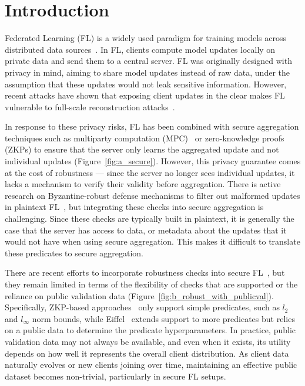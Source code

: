 \section{Introduction}
\label{sec:intro}








Federated Learning (FL) is a widely used paradigm for training models across distributed data sources~\cite{fedavg}. 
In FL, clients compute model updates locally on private data and send them to a central server. 
FL was originally designed with privacy in mind, aiming to share model updates instead of raw data, under the assumption that these updates would not leak sensitive information. However, recent attacks have shown that exposing client updates in the clear makes FL vulnerable to full-scale reconstruction attacks~\citep{zhu2019deep,geiping2020inverting}.


In response to these privacy risks, FL has been combined with secure aggregation techniques such as multiparty computation (MPC)~\cite{bonawitz2017practical, bell2020secure, fereidooni2021safelearn, so2022lightsecagg} or zero-knowledge proofs (ZKPs) to ensure that the server only learns the aggregated update and not individual updates (Figure~\ref{fig:a_secure}).
However, this privacy guarantee comes at the cost of robustness --- since the server no longer sees individual updates, it lacks a mechanism to verify their validity before aggregation. 
There is active research on Byzantine-robust defense mechanisms to filter out malformed updates in plaintext FL~\cite{sun2019normbound, steinhardt2017normball, yin2018trimmedmean, blanchard2017krum, cao2020fltrust}, but integrating these checks into secure aggregation is challenging.
Since these checks are typically built in plaintext, it is generally the case that the server has access to data, or metadata about the updates that it would not have when using secure aggregation. This makes it difficult to translate these predicates to secure aggregation.




There are recent efforts to incorporate robustness checks into secure FL~\cite{franzese2023robust}, but they remain limited in terms of the flexibility of checks that are supported or the reliance on public validation data (Figure~\ref{fig:b_robust_with_publicval}).
Specifically, ZKP-based approaches~\cite{rofl, elsa} only support simple predicates, such as $l_2$ and $l_{\infty}$ norm bounds, while Eiffel~\cite{CCS:CGJv22} extends support to more predicates but relies on a public data to determine the predicate hyperparameters.
In practice, public validation data may not always be available, and even when it exists, its utility depends on how well it represents the overall client distribution. As client data naturally evolves or new clients joining over time, maintaining an effective public dataset becomes non-trivial, particularly in secure FL setups. 

